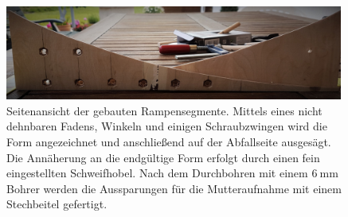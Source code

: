 \begin{figure}[htbp]
\centering
 \includegraphics[width=0.99\textwidth]{images/rampenschliff1.jpg}
  \caption[Gesägte und gehobelte Rampensegmente]{Seitenansicht der gebauten Rampensegmente. Mittels eines nicht dehnbaren Fadens, Winkeln und einigen Schraubzwingen wird die Form angezeichnet und anschließend auf der Abfallseite ausgesägt. Die Annäherung an die endgültige Form erfolgt durch einen fein eingestellten Schweifhobel. Nach dem Durchbohren mit einem $\SI{6}{\milli\metre}$ Bohrer werden die Aussparungen für die Mutteraufnahme mit einem Stechbeitel gefertigt.}
  \label{fig:rampenschliff1}
  \vspace{-0pt}
\end{figure}